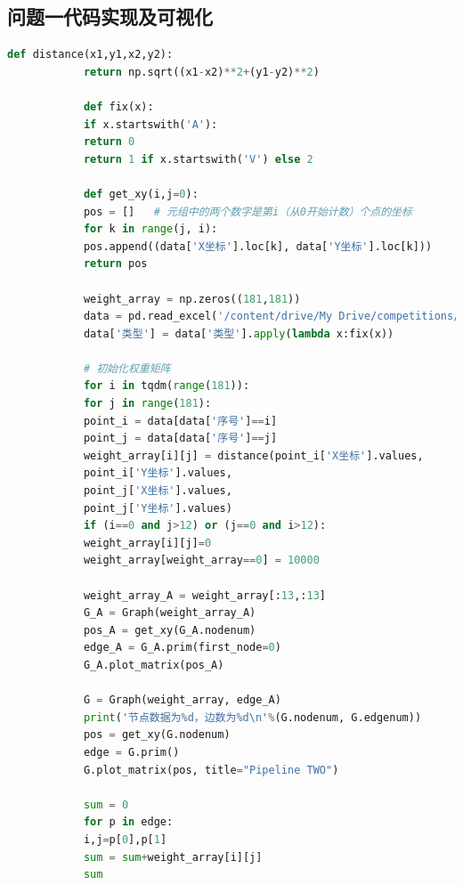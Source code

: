 \documentclass{whutmod}
\begin{document}
		\subsection*{问题一代码实现及可视化}
			\begin{lstlisting}[language=python]
			def distance(x1,y1,x2,y2):
			return np.sqrt((x1-x2)**2+(y1-y2)**2)
			
			def fix(x):
			if x.startswith('A'):
			return 0
			return 1 if x.startswith('V') else 2
			
			def get_xy(i,j=0):
			pos = []   # 元组中的两个数字是第i（从0开始计数）个点的坐标
			for k in range(j, i):
			pos.append((data['X坐标'].loc[k], data['Y坐标'].loc[k]))
			return pos
			
			weight_array = np.zeros((181,181))
			data = pd.read_excel('/content/drive/My Drive/competitions/CMCM/demo1/data.xlsx')
			data['类型'] = data['类型'].apply(lambda x:fix(x))
			
			# 初始化权重矩阵
			for i in tqdm(range(181)):
			for j in range(181):
			point_i = data[data['序号']==i]
			point_j = data[data['序号']==j]
			weight_array[i][j] = distance(point_i['X坐标'].values,
			point_i['Y坐标'].values,
			point_j['X坐标'].values,
			point_j['Y坐标'].values)
			if (i==0 and j>12) or (j==0 and i>12):
			weight_array[i][j]=0
			weight_array[weight_array==0] = 10000
			
			weight_array_A = weight_array[:13,:13]
			G_A = Graph(weight_array_A)
			pos_A = get_xy(G_A.nodenum)
			edge_A = G_A.prim(first_node=0)
			G_A.plot_matrix(pos_A)
			
			G = Graph(weight_array, edge_A)
			print('节点数据为%d，边数为%d\n'%(G.nodenum, G.edgenum))
			pos = get_xy(G.nodenum)
			edge = G.prim()
			G.plot_matrix(pos, title="Pipeline TWO")
			
			sum = 0
			for p in edge:
			i,j=p[0],p[1]
			sum = sum+weight_array[i][j]
			sum
			\end{lstlisting}
			
\end{document}
